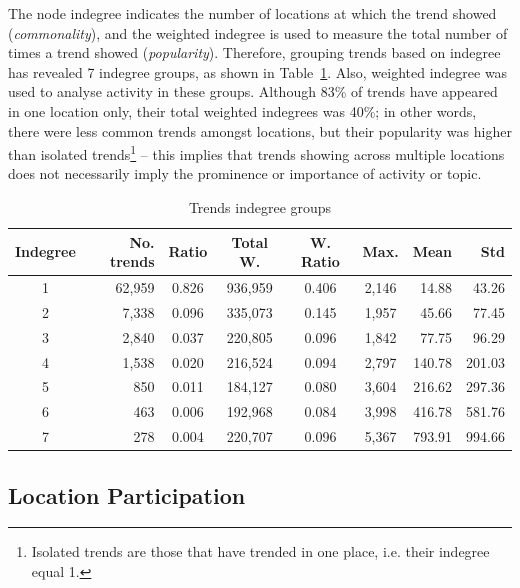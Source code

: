 \documentclass{llncs}
\begin{document}
The node indegree indicates the number of locations at which the trend
showed ({\emph{commonality}}), and the weighted indegree is used to
measure the total number of times a trend showed
({\emph{popularity}}). Therefore, grouping trends based on indegree
has revealed 7 indegree groups, as shown in
Table~\ref{tbl:trendsindegree}.  Also, weighted indegree was used to
analyse activity in these groups.  Although 83\% of trends have
appeared in one location only, their total weighted indegrees was
40\%; in other words, there were less common trends amongst locations,
but their popularity was higher than isolated trends\footnote{Isolated
trends are those that have trended in one place, i.e. their indegree
equal 1.} -- this implies that trends showing across multiple
locations does not necessarily imply the prominence or importance of
activity or topic.

\begin{table}[!h]
\centering
\caption{Trends indegree groups}
\begin{tabular}{@{}crccccrr@{}}
\toprule
Indegree & No. trends & Ratio & Total W. & W. Ratio & Max. & Mean & Std \\ 
\midrule
1 & 62,959 & 0.826 & 936,959 & 0.406 & 2,146 &   14.88 &   43.26\\
2 &   7,338 & 0.096 & 335,073 & 0.145 & 1,957 &   45.66 &   77.45\\
3 &   2,840 & 0.037 & 220,805 & 0.096 & 1,842 &   77.75 &   96.29\\
4 &   1,538 & 0.020 & 216,524 & 0.094 & 2,797 & 140.78 & 201.03\\
5 &      850 & 0.011 & 184,127 & 0.080 & 3,604 & 216.62 & 297.36\\
6 &      463 & 0.006 & 192,968 & 0.084 & 3,998 & 416.78 & 581.76\\
7 &      278 & 0.004 & 220,707 & 0.096 & 5,367 & 793.91 & 994.66\\
\bottomrule
\end{tabular}
\label{tbl:trendsindegree}
\end{table}

\subsection{Location Participation}
\end{document}
